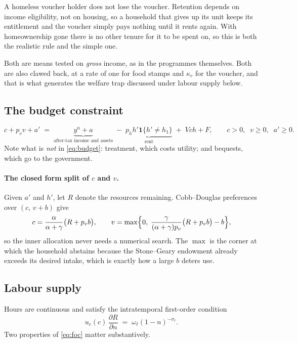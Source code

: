 \documentclass[11pt]{article}
\newcommand{\ind}[1]{\mathbf{1}\{#1\}}
\begin{document}
A homeless voucher holder does not lose the voucher. Retention depends on
income eligibility, not on housing, so a household that gives up its unit keeps
its entitlement and the voucher simply pays nothing until it rents again. With
homeownership gone there is no other tenure for it to be spent on, so this is
both the realistic rule and the simple one.

Both are means tested on \emph{gross} income, as in the programmes themselves.
Both are also clawed back, at a rate of one for food stamps and $\kappa_r$ for
the voucher, and that is what generates the welfare trap discussed under
labour supply below.

\subsection{The budget constraint}

\begin{equation}
c+p_v v+a' \;=\; \underbrace{y^{n}+a}_{\text{after-tax income and assets}}
\;-\;\underbrace{p_h h'\ind{h'\neq h_1}}_{\text{rent}}
\;+\;V\!ch+F,
\qquad c>0,\;\;v\ge0,\;\;a'\ge0 .
\label{eq:budget}
\end{equation}
Note what is \emph{not} in \eqref{eq:budget}: treatment, which costs utility;
and bequests, which go to the government.

\paragraph{The closed form split of $c$ and $v$.} Given $a'$ and $h'$, let
$R$ denote the resources remaining. Cobb--Douglas preferences over
$(c,\,v+b)$ give
\begin{equation}
c=\frac{\alpha}{\alpha+\gamma}\bigl(R+p_v b\bigr),
\qquad
v=\max\Bigl\{0,\;\frac{\gamma}{(\alpha+\gamma)p_v}\bigl(R+p_v b\bigr)-b\Bigr\},
\label{eq:cv}
\end{equation}
so the inner allocation never needs a numerical search. The $\max$ is the corner
at which the household abstains because the Stone--Geary endowment already
exceeds its desired intake, which is exactly how a large $b$ deters use.

\subsection{Labour supply}

Hours are continuous and satisfy the intratemporal first-order condition
\begin{equation}
u_c(c)\,\frac{\partial R}{\partial n}\;=\;\omega_{\ell}(1-n)^{-\sigma_{\ell}} .
\label{eq:foc}
\end{equation}
Two properties of \eqref{eq:foc} matter substantively.
\end{document}

